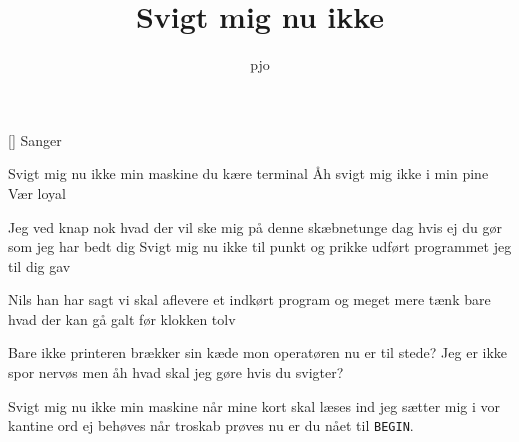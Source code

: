\documentclass[a4paper,11pt]{article}
\title{Svigt mig nu ikke}
\author{pjo}
\begin{document}
\maketitle

\begin{roles}
[] Sanger
\end{roles}

\begin{song}
Svigt mig nu ikke min maskine
du kære terminal
Åh svigt mig ikke i min pine
Vær loyal

Jeg ved knap nok hvad der vil ske mig
på denne skæbnetunge dag
hvis ej du gør som jeg har bedt dig
Svigt mig nu ikke
til punkt og prikke
udført programmet jeg til dig gav

Nils han har sagt vi skal aflevere
et indkørt program og meget mere
tænk bare hvad der kan gå galt
før klokken tolv

Bare ikke printeren brækker sin kæde
mon operatøren nu er til stede?
Jeg er ikke spor nervøs men åh
hvad skal jeg gøre hvis du svigter?

Svigt mig nu ikke min maskine
når mine kort skal læses ind
jeg sætter mig i vor kantine
ord ej behøves
når troskab prøves
nu er du nået til {\tt BEGIN}.
\end{song}
\end{document}
